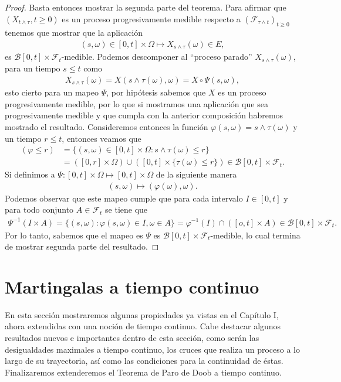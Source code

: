 \begin{proof}
Basta entonces mostrar la segunda parte del teorema. Para afirmar que $(X_{t \wedge \tau}, t \geq 0)$ es un proceso progresivamente medible respecto a $(\mathcal{F}_{\tau \wedge t})_{t \geq 0}$ tenemos que mostrar que la aplicación
\begin{align*}
	(s, \omega) \in [0, t] \times \Omega \mapsto X_{s \wedge \tau} (\omega) \in E,
\end{align*}
es $\mathcal{B}[0, t] \times \mathcal{F}_t$-medible. Podemos descomponer al ``proceso parado'' $X_{s \wedge \tau} (\omega)$, para un tiempo $s \leq t$ como
\begin{align*}
	X_{s \wedge \tau} (\omega) = X(s \wedge \tau (\omega), \omega) = X \circ \Psi (s, \omega),
\end{align*}
esto cierto para un mapeo $\Psi$, por hipótesis sabemos que $X$ es un proceso progresivamente medible, por lo que si mostramos una aplicación que sea progresivamente medible y que cumpla con la anterior composición habremos mostrado el resultado. Consideremos entonces la función $\varphi (s, \omega) = s \wedge \tau(\omega)$ y un tiempo $r \leq t$, entonces veamos que 
\begin{align*}
	(\varphi \leq r) & = \{ (s, \omega) \in [0, t] \times \Omega : s \wedge \tau(\omega) \leq r \} \\
    & = ([0, r] \times \Omega) \cup ([0, t] \times \{ \tau (\omega) \leq r \}) \in \mathcal{B}[0, t] \times \mathcal{F}_t.
\end{align*}
Si definimos a $\Psi: [0, t] \times \Omega \mapsto [0, t] \times \Omega$ de la siguiente manera
\begin{align*}
	(s, \omega) \mapsto (\varphi(\omega), \omega).
\end{align*}
Podemos observar que este mapeo cumple que para cada intervalo $I \in [0, t]$ y para todo conjunto $A \in \mathcal{F}_t$ se tiene que
\begin{align*}
	\Psi^{-1}(I \times A) = \{ (s, \omega) : \varphi(s, \omega) \in I, \omega \in A \} = \varphi^{-1}(I) \cap ([o, t] \times A) \in \mathcal{B}[0, t] \times \mathcal{F}_t.
\end{align*}
Por lo tanto, sabemos que el mapeo es $\Psi$ es $\mathcal{B}[0, t] \times \mathcal{F}_t$-medible, lo cual termina de mostrar segunda parte del resultado.
\end{proof}

\section{Martingalas a tiempo continuo}
En esta sección mostraremos algunas propiedades ya vistas en el Capítulo I, ahora extendidas con una noción de tiempo continuo. Cabe destacar algunos resultados nuevos e importantes dentro de esta sección, como serán las desigualdades maximales a tiempo continuo, los cruces que realiza un proceso a lo largo de su trayectoria, así como las condiciones para la continuidad de éstas. Finalizaremos extenderemos el Teorema de Paro de Doob a tiempo continuo. \\

